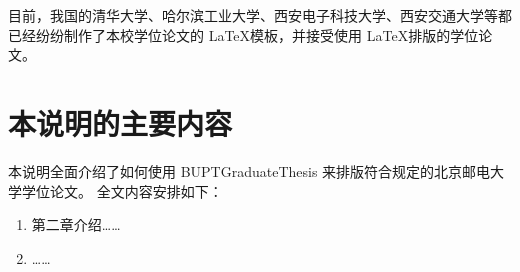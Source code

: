 目前，我国的清华大学、哈尔滨工业大学、西安电子科技大学、西安交通大学等都已经纷纷制作了本校学位论文的 \LaTeX 模板，并接受使用 \LaTeX 排版的学位论文。

\section{本说明的主要内容}
本说明全面介绍了如何使用 BUPTGraduateThesis 来排版符合规定的北京邮电大学学位论文。
全文内容安排如下：

\begin{enumerate}
\item 第二章介绍……
\item ……
\end{enumerate}

\ifx\usechapbib\empty
\nocite{BSTcontrol}


\fi
